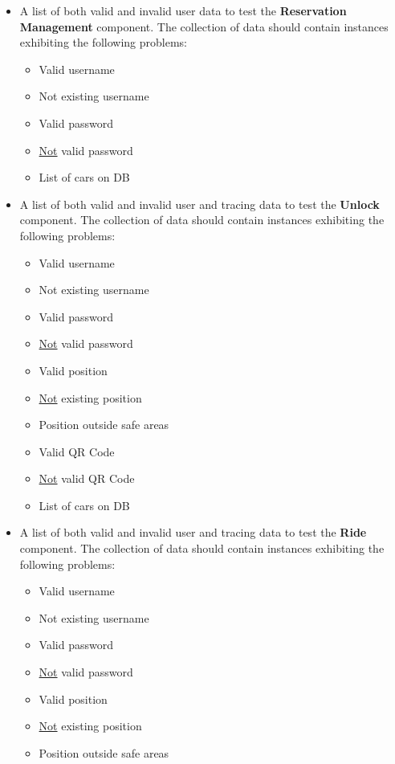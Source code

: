 \documentclass[english]{article}
\begin{document}
\begin{itemize}
    \item{A list of both valid and invalid user data to test the \textbf{Reservation Management} component.
    The collection of data should contain instances exhibiting the following problems:
    \begin{itemize}
      \item{Valid username}
      \item{Not existing username}
      \item{Valid password}
      \item{\underline{Not} valid password}
      \item{List of cars on DB}
    \end{itemize}}

    \item{A list of both valid and invalid user and tracing data to test the \textbf{Unlock} component.
    The collection of data should contain instances exhibiting the following problems:
    \begin{itemize}
      \item{Valid username}
      \item{Not existing username}
      \item{Valid password}
      \item{\underline{Not} valid password}
      \item{Valid position}
      \item{\underline{Not} existing position}
      \item{Position outside safe areas}
      \item{Valid QR Code}
      \item{\underline{Not} valid QR Code}
      \item{List of cars on DB}
    \end{itemize}}

    \item{A list of both valid and invalid user and tracing data to test the \textbf{Ride} component.
    The collection of data should contain instances exhibiting the following problems:
    \begin{itemize}
      \item{Valid username}
      \item{Not existing username}
      \item{Valid password}
      \item{\underline{Not} valid password}
      \item{Valid position}
      \item{\underline{Not} existing position}
      \item{Position outside safe areas}
    \end{itemize}}


\end{itemize}
\end{document}
